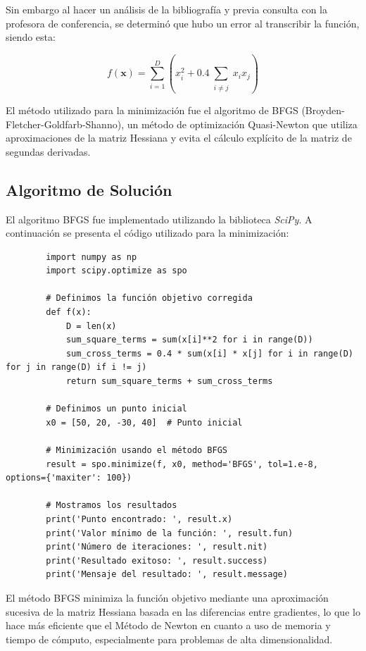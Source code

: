 \documentclass{article}
\begin{document}
	\vspace*{1cm}
	
	Sin embargo al hacer un análisis de la bibliografía \cite{reference29} y previa consulta con la profesora de conferencia, se determinó que hubo un error al transcribir la función, siendo esta:
	
	$$
	f(\mathbf{x}) = \sum_{i=1}^D \left(x_i^2 + 0.4 \sum_{\substack{i\neq j}} x_i x_j\right)
	$$
	
	El método utilizado para la minimización fue el algoritmo de BFGS (Broyden-Fletcher-Goldfarb-Shanno), un método de optimización Quasi-Newton que utiliza aproximaciones de la matriz Hessiana y evita el cálculo explícito de la matriz de segundas derivadas.
	
	\subsection{Algoritmo de Solución}
	
	El algoritmo BFGS fue implementado utilizando la biblioteca \textit{SciPy}. A continuación se presenta el código utilizado para la minimización:
	
	\begin{verbatim}
		import numpy as np
		import scipy.optimize as spo
		
		# Definimos la función objetivo corregida
		def f(x):
			D = len(x)
			sum_square_terms = sum(x[i]**2 for i in range(D))
			sum_cross_terms = 0.4 * sum(x[i] * x[j] for i in range(D) for j in range(D) if i != j) 
			return sum_square_terms + sum_cross_terms
		
		# Definimos un punto inicial
		x0 = [50, 20, -30, 40]  # Punto inicial
		
		# Minimización usando el método BFGS
		result = spo.minimize(f, x0, method='BFGS', tol=1.e-8, options={'maxiter': 100})
		
		# Mostramos los resultados
		print('Punto encontrado: ', result.x)
		print('Valor mínimo de la función: ', result.fun)
		print('Número de iteraciones: ', result.nit)
		print('Resultado exitoso: ', result.success)
		print('Mensaje del resultado: ', result.message)
	\end{verbatim}
	
	El método BFGS minimiza la función objetivo mediante una aproximación sucesiva de la matriz Hessiana basada en las diferencias entre gradientes, lo que lo hace más eficiente que el Método de Newton en cuanto a uso de memoria y tiempo de cómputo, especialmente para problemas de alta dimensionalidad.
	
\end{document}
